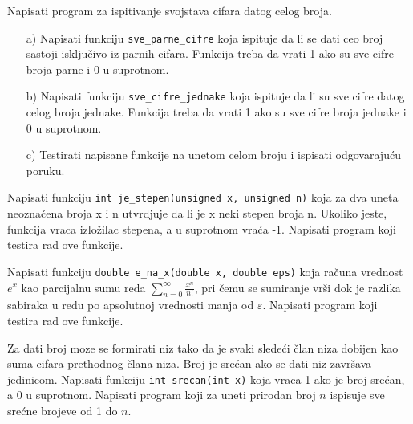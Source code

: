 \begin{Exercise}[label=v1.4_10] 
Napisati program za ispitivanje svojstava cifara datog celog broja.
\begin{itemize}
\item [a)] Napisati funkciju \verb|sve_parne_cifre| koja ispituje da li se dati ceo broj sastoji isključivo iz parnih cifara. Funkcija treba
da vrati 1 ako su sve cifre broja parne i 0 u suprotnom. 
\item [b)] Napisati funkciju \verb|sve_cifre_jednake| koja ispituje da li su sve cifre datog celog broja jednake. Funkcija treba
da vrati 1 ako su sve cifre broja jednake i 0 u suprotnom. 
\item [c)] Testirati napisane funkcije na unetom celom broju i ispisati odgovarajuću poruku.
\end{itemize} 
\end{Exercise}
\begin{Answer}[ref=v1.4_10]
\end{Answer}

\begin{Exercise}[label=v1.4_11] 
Napisati funkciju 
\verb|int je_stepen(unsigned x, unsigned n)|
koja za dva uneta neoznačena broja x i n utvrdjuje da li je x neki stepen
broja n. Ukoliko jeste, funkcija vraca izložilac stepena, a u suprotnom vraća -1. Napisati program koji testira rad ove funkcije.\\ 
\end{Exercise}
\begin{Answer}[ref=v1.4_11]
\end{Answer}

\begin{Exercise}[label=v1.4_12] 
Napisati funkciju 
\verb|double e_na_x(double x, double eps)|
koja računa vrednost $e^x$ kao parcijalnu sumu reda
 $\sum_{n=0}^{\infty}\frac{x^n}{n!}$, pri čemu se sumiranje vrši dok
 je razlika sabiraka u redu po apsolutnoj vrednosti
 manja od $\varepsilon$. Napisati program koji testira rad ove funkcije.\\ 
\end{Exercise}
\begin{Answer}[ref=v1.4_12]
\end{Answer}

\begin{Exercise}[label=v1.4_13] 
Za dati broj moze se formirati niz tako da je svaki sledeći član niza dobijen
kao suma cifara prethodnog člana niza. Broj je srećan ako se dati niz završava 
jedinicom. Napisati funkciju 
\verb|int srecan(int x)|
 koja vraca 1 ako je broj srećan, a 0 u suprotnom. Napisati program koji za uneti prirodan broj $n$ ispisuje sve srećne brojeve od 1 do $n$.\\ 
\end{Exercise}
\begin{Answer}[ref=v1.4_13]
\end{Answer}

